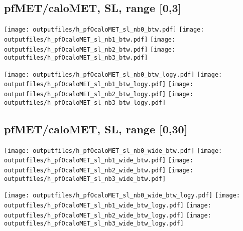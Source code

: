 \documentclass[11pt]{article}
\begin{document}
    \clearpage



    \subsection{ pfMET/caloMET, SL, range [0,3]}

    \noindent
     \texttt{[image: outputfiles/h\_pfOcaloMET\_sl\_nb0\_btw.pdf]}
     \texttt{[image: outputfiles/h\_pfOcaloMET\_sl\_nb1\_btw.pdf]}
     \texttt{[image: outputfiles/h\_pfOcaloMET\_sl\_nb2\_btw.pdf]}
     \texttt{[image: outputfiles/h\_pfOcaloMET\_sl\_nb3\_btw.pdf]}

    \noindent
     \texttt{[image: outputfiles/h\_pfOcaloMET\_sl\_nb0\_btw\_logy.pdf]}
     \texttt{[image: outputfiles/h\_pfOcaloMET\_sl\_nb1\_btw\_logy.pdf]}
     \texttt{[image: outputfiles/h\_pfOcaloMET\_sl\_nb2\_btw\_logy.pdf]}
     \texttt{[image: outputfiles/h\_pfOcaloMET\_sl\_nb3\_btw\_logy.pdf]}

    \clearpage




    \subsection{ pfMET/caloMET, SL, range [0,30]}

    \noindent
     \texttt{[image: outputfiles/h\_pfOcaloMET\_sl\_nb0\_wide\_btw.pdf]}
     \texttt{[image: outputfiles/h\_pfOcaloMET\_sl\_nb1\_wide\_btw.pdf]}
     \texttt{[image: outputfiles/h\_pfOcaloMET\_sl\_nb2\_wide\_btw.pdf]}
     \texttt{[image: outputfiles/h\_pfOcaloMET\_sl\_nb3\_wide\_btw.pdf]}

    \noindent
     \texttt{[image: outputfiles/h\_pfOcaloMET\_sl\_nb0\_wide\_btw\_logy.pdf]}
     \texttt{[image: outputfiles/h\_pfOcaloMET\_sl\_nb1\_wide\_btw\_logy.pdf]}
     \texttt{[image: outputfiles/h\_pfOcaloMET\_sl\_nb2\_wide\_btw\_logy.pdf]}
     \texttt{[image: outputfiles/h\_pfOcaloMET\_sl\_nb3\_wide\_btw\_logy.pdf]}

    \clearpage
\end{document}

